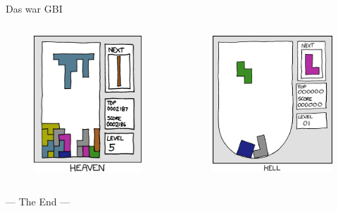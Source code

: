 \begin{frame}{Das war GBI}
	\begin{columns}
		\pause
		\begin{figure}[H]
			\vspace{-20pt}
			\includegraphics[scale=0.45]{xkcd/heaven}
		\end{figure}
	
		\pause
		\begin{figure}[H]
			\vspace{-20pt}
			\includegraphics[scale=0.45]{xkcd/hell}
		\end{figure}
	\end{columns}
\end{frame}

\begin{headframe}
	--- The End ---
\end{headframe}


\slideThanks

